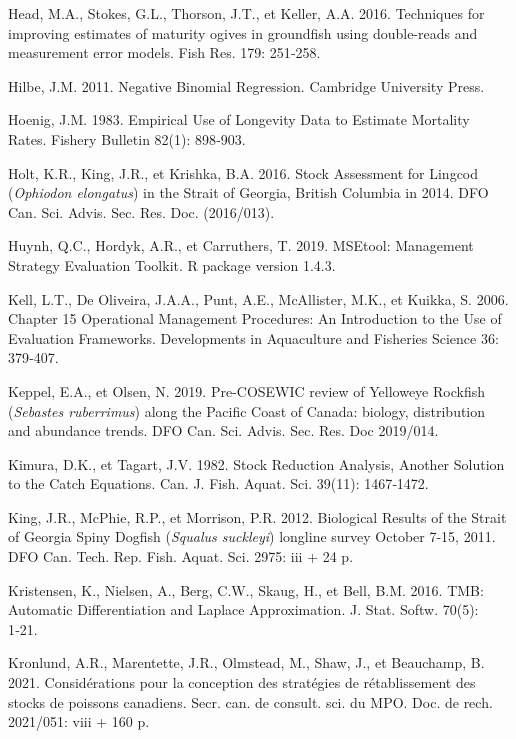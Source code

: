 \documentclass[french,11pt]{book}
\begin{document}
\leavevmode\hypertarget{ref-head2016}{}%
Head, M.A., Stokes, G.L., Thorson, J.T., et Keller, A.A. 2016. Techniques for improving estimates of maturity ogives in groundfish using double-reads and measurement error models. Fish Res. 179: 251‑258.

\leavevmode\hypertarget{ref-hilbe2011}{}%
Hilbe, J.M. 2011. Negative Binomial Regression. Cambridge University Press.

\leavevmode\hypertarget{ref-hoenig1983}{}%
Hoenig, J.M. 1983. Empirical Use of Longevity Data to Estimate Mortality Rates. Fishery Bulletin 82(1): 898‑903.

\leavevmode\hypertarget{ref-holt2016}{}%
Holt, K.R., King, J.R., et Krishka, B.A. 2016. Stock Assessment for Lingcod (\emph{Ophiodon elongatus}) in the Strait of Georgia, British Columbia in 2014. DFO Can. Sci. Advis. Sec. Res. Doc. (2016/013).

\leavevmode\hypertarget{ref-huynh_msetool_2019}{}%
Huynh, Q.C., Hordyk, A.R., et Carruthers, T. 2019. MSEtool: Management Strategy Evaluation Toolkit. R package version 1.4.3.

\leavevmode\hypertarget{ref-kell2006}{}%
Kell, L.T., De Oliveira, J.A.A., Punt, A.E., McAllister, M.K., et Kuikka, S. 2006. Chapter 15 Operational Management Procedures: An Introduction to the Use of Evaluation Frameworks. Developments in Aquaculture and Fisheries Science 36: 379‑407.

\leavevmode\hypertarget{ref-keppel2019}{}%
Keppel, E.A., et Olsen, N. 2019. Pre-COSEWIC review of Yelloweye Rockfish (\emph{Sebastes ruberrimus}) along the Pacific Coast of Canada: biology, distribution and abundance trends. DFO Can. Sci. Advis. Sec. Res. Doc 2019/014.

\leavevmode\hypertarget{ref-kimura1982}{}%
Kimura, D.K., et Tagart, J.V. 1982. Stock Reduction Analysis, Another Solution to the Catch Equations. Can. J. Fish. Aquat. Sci. 39(11): 1467‑1472.

\leavevmode\hypertarget{ref-king2012}{}%
King, J.R., McPhie, R.P., et Morrison, P.R. 2012. Biological Results of the Strait of Georgia Spiny Dogfish (\emph{Squalus suckleyi}) longline survey October 7-15, 2011. DFO Can. Tech. Rep. Fish. Aquat. Sci. 2975: iii + 24 p.

\leavevmode\hypertarget{ref-tmb}{}%
Kristensen, K., Nielsen, A., Berg, C.W., Skaug, H., et Bell, B.M. 2016. TMB: Automatic Differentiation and Laplace Approximation. J. Stat. Softw. 70(5): 1‑21.

\leavevmode\hypertarget{ref-kronlund2020}{}%
Kronlund, A.R., Marentette, J.R., Olmstead, M., Shaw, J., et Beauchamp, B. 2021. Considérations pour la conception des stratégies de rétablissement des stocks de poissons canadiens. Secr. can. de consult. sci. du MPO. Doc. de rech. 2021/051: viii + 160 p.
\end{document}
